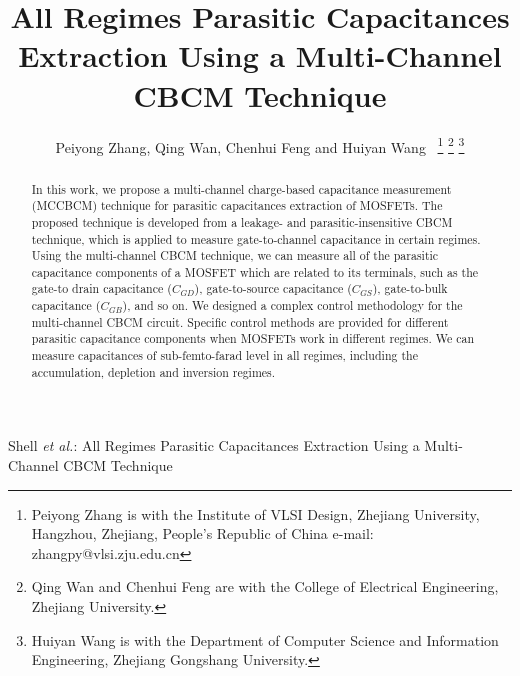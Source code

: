 \documentclass[journal]{IEEEtran}
\begin{document}
%

\title{All Regimes Parasitic Capacitances Extraction Using a Multi-Channel CBCM Technique}
%


\author{Peiyong Zhang, Qing Wan, Chenhui Feng and Huiyan Wang~%
\thanks{Peiyong Zhang is with the Institute of VLSI Design, Zhejiang University, Hangzhou, Zhejiang, People's Republic of China e-mail: zhangpy@vlsi.zju.edu.cn }%
\thanks{Qing Wan and Chenhui Feng are with the College of Electrical Engineering, Zhejiang University.}%
\thanks{Huiyan Wang is with the Department of Computer Science and Information Engineering, Zhejiang Gongshang University.}}




%
{Shell \MakeLowercase{\textit{et al.}}: All Regimes Parasitic Capacitances Extraction Using a Multi-Channel CBCM Technique}





\maketitle


\begin{abstract}
In this work, we propose a multi-channel charge-based capacitance measurement (MCCBCM) technique for parasitic capacitances extraction of MOSFETs. The proposed technique is developed from a leakage- and parasitic-insensitive CBCM technique, which is applied to measure gate-to-channel capacitance in certain regimes. Using the multi-channel CBCM technique, we can measure all of the parasitic capacitance components of a MOSFET which are related to its terminals, such as the gate-to drain capacitance ($C_{GD}$), gate-to-source capacitance ($C_{GS}$), gate-to-bulk capacitance ($C_{GB}$), and so on. We designed a complex control methodology for the multi-channel CBCM circuit. Specific control methods are provided for different parasitic capacitance components when MOSFETs work in different regimes. We can measure capacitances of sub-femto-farad level in all regimes,  including the accumulation, depletion and inversion regimes.

\end{abstract}
\end{document}
